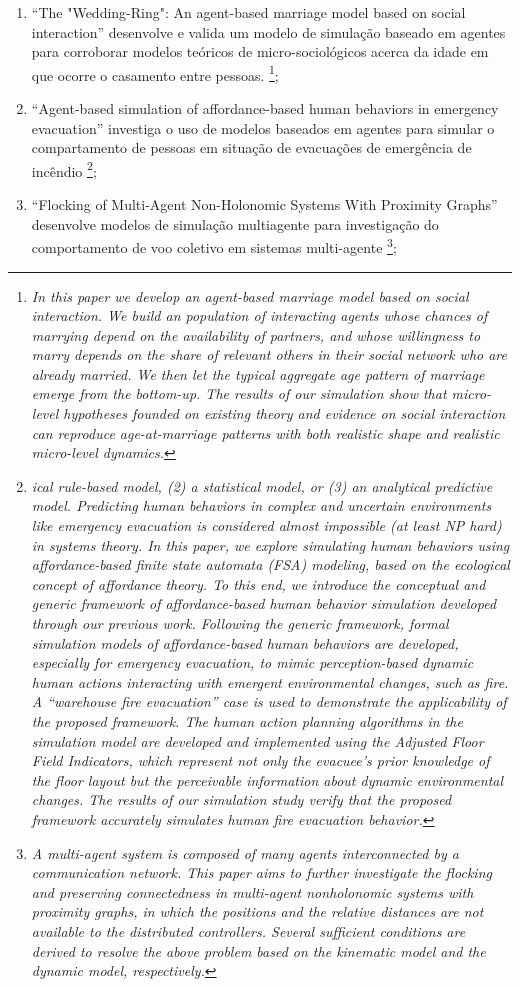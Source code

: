 \begin{enumerate}
\item ``The "Wedding-Ring": An agent-based marriage model based on social interaction'' desenvolve e valida um modelo de simulação baseado em agentes para corroborar modelos teóricos de micro-sociológicos acerca da idade em que ocorre o casamento entre pessoas. \footnote{\textit{In this paper we develop an agent-based marriage model based on social interaction. We build an population of interacting agents whose chances of marrying depend on the availability of partners, and whose willingness to marry depends on the share of relevant others in their social network who are already married. We then let the typical aggregate age pattern of marriage emerge from the bottom-up. The results of our simulation show that micro-level hypotheses founded on existing theory and evidence on social interaction can reproduce age-at-marriage patterns with both realistic shape and realistic micro-level dynamics.}};
\item ``Agent-based simulation of affordance-based human behaviors in emergency evacuation'' investiga o uso de modelos baseados em agentes para simular o compartamento de pessoas em situação de evacuações de emergência de incêndio \footnote{\textit{ical rule-based model, (2) a statistical model, or (3) an analytical predictive model. Predicting human behaviors in complex and uncertain environments like emergency evacuation is considered almost impossible (at least NP hard) in systems theory. In this paper, we explore simulating human behaviors using affordance-based finite state automata (FSA) modeling, based on the ecological concept of affordance theory. To this end, we introduce the conceptual and generic framework of affordance-based human behavior simulation developed through our previous work. Following the generic framework, formal simulation models of affordance-based human behaviors are developed, especially for emergency evacuation, to mimic perception-based dynamic human actions interacting with emergent environmental changes, such as fire. A “warehouse fire evacuation” case is used to demonstrate the applicability of the proposed framework. The human action planning algorithms in the simulation model are developed and implemented using the Adjusted Floor Field Indicators, which represent not only the evacuee’s prior knowledge of the floor layout but the perceivable information about dynamic environmental changes. The results of our simulation study verify that the proposed framework accurately simulates human fire evacuation behavior.}};
\item ``Flocking of Multi-Agent Non-Holonomic Systems With Proximity Graphs'' desenvolve modelos de simulação multiagente para investigação do comportamento de voo coletivo em sistemas multi-agente \footnote{\textit{A multi-agent system is composed of many agents interconnected by a communication network. This paper aims to further investigate the flocking and preserving connectedness in multi-agent nonholonomic systems with proximity graphs, in which the positions and the relative distances are not available to the distributed controllers. Several sufficient conditions are derived to resolve the above problem based on the kinematic model and the dynamic model, respectively. }};

\end{enumerate}
